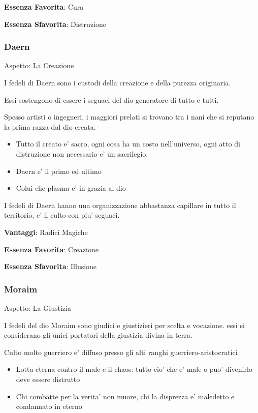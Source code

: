 \documentclass[a4paper,11pt,twoside,openany]{book}
\begin{document}
\textbf{Essenza Favorita}: Cura

\textbf{Essenza Sfavorita}: Distruzione

\bigskip

\subsubsection{Daern}

Aspetto: La Creazione
\bigskip


I fedeli di Daern sono i custodi della creazione e della purezza originaria.

Essi sostengono di essere i seguaci del dio generatore di tutto e tutti.

Spesso artisti o ingegneri, i maggiori prelati si trovano tra i nani che si reputano la prima razza dal dio creata.

\begin{itemize}
	\item Tutto il creato e' sacro, ogni cosa ha un costo nell'universo, ogni atto di distruzione non necessario e' un sacrilegio.
	\item Daern e' il primo ed ultimo
	\item Colui che plasma e' in grazia al dio
\end{itemize}


I fedeli di Daern hanno una organizzazione abbastanza capillare in tutto il territorio, e' il culto con piu' seguaci.


\textbf{Vantaggi}: Radici Magiche

\textbf{Essenza Favorita}: Creazione

\textbf{Essenza Sfavorita}: Illusione

\bigskip
\subsubsection{Moraim}

Aspetto: La Giustizia
\bigskip


I fedeli del dio Moraim sono giudici e giustizieri per scelta e vocazione. essi si considerano gli unici portatori della giustizia divina in terra.


Culto molto guerriero e' diffuso presso gli alti ranghi guerriero-aristocratici

\begin{itemize}
	\item Lotta eterna contro il male e il chaos: tutto cio' che e' male o puo' divenirlo deve essere distrutto
	\item Chi combatte per la verita' non muore, chi la disprezza e' maledetto e condannato in eterno
\end{itemize}
\end{document}
